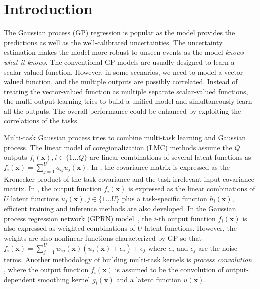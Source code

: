 \section{Introduction}

The Gaussian process (GP) regression is popular as the model provides the predictions as well as the well-calibrated uncertainties. The uncertainty estimation makes the model more robust to unseen events as the model \emph{knows what it knows}. The conventional GP models are usually designed to learn a scalar-valued function. However, in some scenarios, we need to model a vector-valued function, and the multiple outputs are possibly correlated. Instead of treating the vector-valued function as multiple separate scalar-valued functions, the multi-output learning \cite{zhang2017survey} tries to build a unified model and simultaneously learn all the outputs. The overall performance could be enhanced by exploiting the correlations of the tasks.

Multi-task Gaussian process \cite{vectorvaluedkernel} tries to combine multi-task learning and Gaussian process. The linear model of coregionalization (LMC) methods \cite{journel1978mining} assume the $Q$ outputs $f_i(\bm{x}), i \in \{1\dots Q\}$ are linear combinations of several latent functions as $f_i(\bm{x}) = \sum_{j=1}^U a_{ij} u_j(\bm{x})$. In \cite{bonilla2008multi}, the covariance matrix is expressed as the Kronecker product of the task covariance and the task-irrelevant input covariance matrix. In \cite{nguyen2014collaborative}, the output function $f_i(\bm{x})$ is expressed as the linear combinations of $U$ latent functions $u_j(\bm{x}), j \in \{1\dots U\}$ plus a task-specific function $h_i(\bm{x})$, efficient training and inference methods are also developed. In the Gaussian process regression network (GPRN) model~\cite{wilson2012gaussian}, the $i$-th output function $f_i(\bm{x})$ is also expressed as weighted combinations of $U$ latent functions. However, the weights are also nonlinear functions characterized by GP so that $f_i(\bm{x}) = \sum_{j=1}^U w_{ij}(\bm{x}) (u_j(\bm{x}) + \epsilon_u) + \epsilon_f$ where $\epsilon_u$ and $\epsilon_f$ are the noise terms. Another methodology of building multi-task kernels is \emph{process convolution} \cite{boyle2005dependent,alvarez2009sparse,alvarez2011computationally}, where the output function $f_i(\bm{x})$ is assumed to be the convolution of output-dependent smoothing kernel $g_i(\bm{x})$ and a latent function $u(\bm{x})$.

